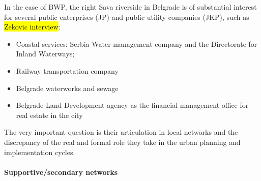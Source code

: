 \documentclass[11pt]{report}
\begin{document}
In the case of BWP, the right Sava riverside in Belgrade is of substantial interest for several public enterprises (JP) and public utility companies (JKP), such as \hl{Zekovic interview}: 
\begin{itemize}
\item Coastal services: Serbia Water-management company and the Directorate for Inland Waterways;
\item Railway transportation company
\item Belgrade waterworks and sewage
\item Belgrade Land Development agency as the financial management office for real estate in the city
\end{itemize}
The very important question is their articulation in local networks and the discrepancy of the real and formal role they take in the urban planning and implementation cycles.

\paragraph{Supportive/secondary networks}
\end{document}
